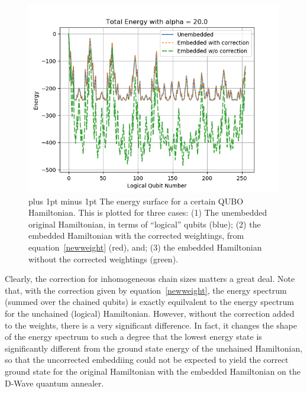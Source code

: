 \documentclass[preprint,12pt,eqsecnum,nofootinbib,amsmath,amssymb]{revtex4}
\newcommand{\bibskip}{\baselineskip16pt plus 1pt minus 1pt}
\newcommand{\footnoteskip}{\baselineskip 12pt plus 1pt minus 1pt}
\begin{document}
%
\begin{figure}[h!]
\includegraphics[scale=0.8]{figs/energy.png} 
\caption{\footnoteskip  
%
  The energy surface for a certain QUBO Hamiltonian. This is plotted for three cases:  (1) The unembedded original Hamiltonian,
  in terms of ``logical'' qubits (blue); (2) the embedded Hamiltonian with the corrected weightings, from equation~\ref{newweight} (red),
  and; (3) the embedded Hamiltonian without the corrected weightings (green).
%
}
\label{fig_energy}
\end{figure} 
%
Clearly, the correction for inhomogeneous chain sizes matters a great deal. Note that, with the correction given by equation~\ref{newweight},
the energy spectrum (summed over the chained qubits) is exactly equilvalent to the energy spectrum for the unchained (logical) Hamiltonian.
However, without the correction added to the weights, there is a very significant difference. In fact, it changes the shape of the energy spectrum
to such a degree that the lowest energy state is significantly different from the ground state energy of the unchained Hamiltonian, so that the
uncorrected embeddiing could not be expected to yield the correct ground state for the original Hamiltonian with the embedded Hamiltonian on the
D-Wave quantum annealer.



\end{document}
